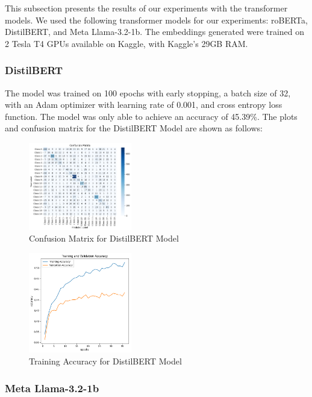 This subsection presents the results of our experiments with the transformer models. We used the following transformer models for our experiments: roBERTa, DistilBERT, and Meta Llama-3.2-1b. The embeddings generated were trained on 2 Tesla T4 GPUs available on Kaggle, with Kaggle's 29GB RAM.

\subsubsection{DistilBERT}
The model was trained on 100 epochs with early stopping, a batch size of 32, with an Adam optimizer with learning rate of 0.001, and cross entropy loss function. The model was only able to achieve an accuracy of 45.39\%. The plots and confusion matrix for the DistilBERT Model are shown as follows:

\begin{figure}[H]
    \centering
    \includegraphics[width=0.4\textwidth]{distilbert_confmat.png}
    \caption{Confusion Matrix for DistilBERT Model}
    \label{fig:distilbert_confmat}
\end{figure}

\begin{figure}[H]
    \centering
    \includegraphics[width=0.4\textwidth]{distilbert_trainaccuracy.png}
    \caption{Training Accuracy for DistilBERT Model}
    \label{fig:distilbert_trainaccuracy}
\end{figure}

\subsubsection{Meta Llama-3.2-1b}

